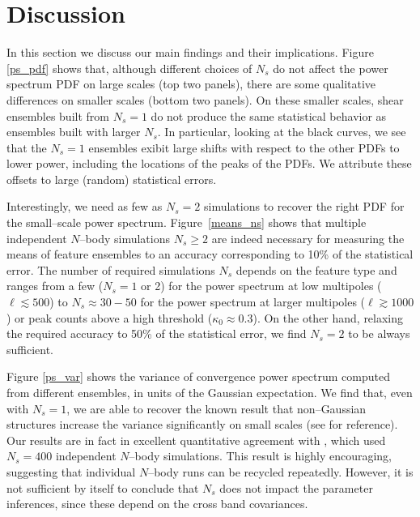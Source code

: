 \documentclass[reprint,aps,prd,superscriptaddress,showkeys,showpacs]{revtex4-1}
\begin{document}

\section{Discussion}

In this section we discuss our main findings and their
implications. Figure \ref{ps_pdf} shows that, although different
choices of $N_s$ do not affect the power spectrum PDF on large scales
(top two panels), there are some qualitative differences on smaller
scales (bottom two panels). On these smaller scales, shear ensembles
built from $N_s=1$ do not produce the same statistical behavior as
ensembles built with larger $N_s$. In particular, looking at the black
curves, we see that the $N_s=1$ ensembles exibit large shifts with
respect to the other PDFs to lower power, including the locations of
the peaks of the PDFs.  We attribute these offsets to large (random)
statistical errors.

Interestingly, we need as few as $N_s=2$ simulations to recover the
right PDF for the small--scale power spectrum.  Figure~\ref{means_ns}
shows that multiple independent $N$--body simulations $N_s\geq2$ are
indeed necessary for measuring the means of feature ensembles to an
accuracy corresponding to 10\% of the statistical error. The number of
required simulations $N_s$ depends on the feature type and ranges from
a few ($N_s=1$ or 2) for the power spectrum at low multipoles
($\ell\lesssim 500$) to $N_s\approx 30-50$ for the power spectrum at
larger multipoles ($\ell\gtrsim1000$) or peak counts above a high
threshold ($\kappa_0\approx0.3$).  On the other hand, relaxing the
required accuracy to 50\% of the statistical error, we find $N_s=2$ to
be always sufficient.

Figure \ref{ps_var} shows the variance of convergence power spectrum
computed from different ensembles, in units of the Gaussian
expectation. We find that, even with $N_s=1$, we are able to recover
the known result that non--Gaussian structures increase the variance
significantly on small scales (see \citep{Sato12,TakadaSpergel14} for
reference).  Our results are in fact in excellent quantitative
agreement with \citep{Sato12}, which used $N_s=400$ independent $N$--body
simulations.  This result is highly encouraging, suggesting that
individual $N$--body runs can be recycled repeatedly.  However, it is
not sufficient by itself to conclude that $N_s$ does not impact the
parameter inferences, since these depend on the cross band
covariances.
\end{document}
